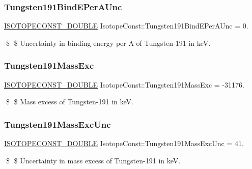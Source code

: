 \subsubsection{\texorpdfstring{Tungsten191\+Bind\+E\+Per\+A\+Unc}{Tungsten191BindEPerAUnc}}
{\footnotesize\ttfamily \mbox{\hyperlink{group___isotope_const-_macros_ga8f45a7272ce02c0b4c65c44636ed719a}{I\+S\+O\+T\+O\+P\+E\+C\+O\+N\+S\+T\+\_\+\+D\+O\+U\+B\+LE}} Isotope\+Const\+::\+Tungsten191\+Bind\+E\+Per\+A\+Unc = 0.}

\$ \$ Uncertainty in binding energy per A of Tungsten-\/191 in keV. \mbox{\label{group___isotope_const-_tungsten-_w191_ga657814f78df6fd05f6ed7c0db92e93d2}} 
\subsubsection{\texorpdfstring{Tungsten191\+Mass\+Exc}{Tungsten191MassExc}}
{\footnotesize\ttfamily \mbox{\hyperlink{group___isotope_const-_macros_ga8f45a7272ce02c0b4c65c44636ed719a}{I\+S\+O\+T\+O\+P\+E\+C\+O\+N\+S\+T\+\_\+\+D\+O\+U\+B\+LE}} Isotope\+Const\+::\+Tungsten191\+Mass\+Exc = -\/31176.}

\$ \$ Mass excess of Tungsten-\/191 in keV. \mbox{\label{group___isotope_const-_tungsten-_w191_gae8f783f15e20706c499a23b20addbf8b}} 
\subsubsection{\texorpdfstring{Tungsten191\+Mass\+Exc\+Unc}{Tungsten191MassExcUnc}}
{\footnotesize\ttfamily \mbox{\hyperlink{group___isotope_const-_macros_ga8f45a7272ce02c0b4c65c44636ed719a}{I\+S\+O\+T\+O\+P\+E\+C\+O\+N\+S\+T\+\_\+\+D\+O\+U\+B\+LE}} Isotope\+Const\+::\+Tungsten191\+Mass\+Exc\+Unc = 41.}

\$ \$ Uncertainty in mass excess of Tungsten-\/191 in keV. \mbox{\label{group___isotope_const-_tungsten-_w191_ga571cf08f3cf964dc526301a3c9a78640}} 
